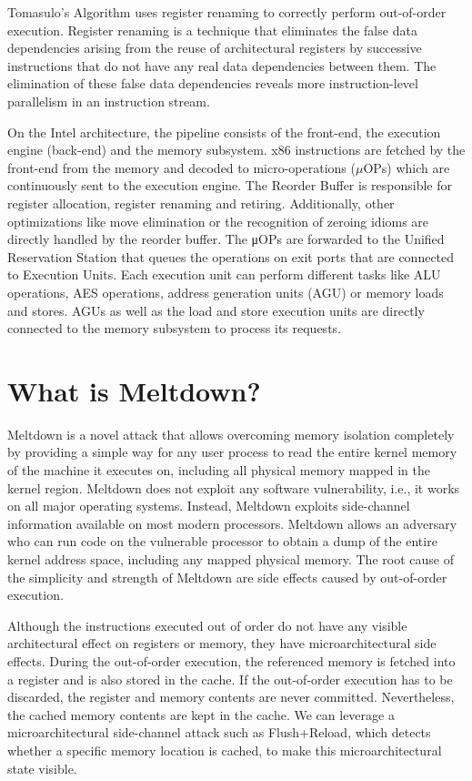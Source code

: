 \documentclass[runningheads]{llncs}
\begin{document}
Tomasulo's Algorithm uses register renaming to correctly perform out-of-order execution. Register renaming is a technique that eliminates the false data dependencies arising from the reuse of architectural registers by successive instructions that do not have any real data dependencies between them. The elimination of these false data dependencies reveals more instruction-level parallelism in an instruction stream. 

On the Intel architecture, the pipeline consists of the front-end, the execution engine (back-end) and the memory subsystem. x86 instructions are fetched by the front-end from the memory and decoded to micro-operations ($\mu$OPs) which are continuously sent to the execution engine. The Reorder Buffer is responsible for register allocation, register renaming and retiring. Additionally, other optimizations like move elimination or the recognition of zeroing idioms are directly handled by the reorder buffer. The μOPs are forwarded to the Unified Reservation Station that queues the operations on exit ports that are connected to Execution Units. Each execution unit can perform different tasks like ALU operations, AES operations, address generation units (AGU) or memory loads and stores. AGUs as well as the load and store execution units are directly connected to the memory subsystem to process its requests.

\section{What is Meltdown?}
Meltdown is a novel attack that allows overcoming memory isolation completely by providing a simple way for any user process to read the entire kernel memory of the machine it executes on, including all physical memory mapped in the kernel region. Meltdown does not exploit any software vulnerability, i.e., it works on all major operating systems. Instead, Meltdown exploits side-channel information available on most modern processors. Meltdown allows an adversary who can run code on the vulnerable processor to obtain a dump of the entire kernel address space, including any mapped physical memory. The root cause of the simplicity and strength of Meltdown are side effects caused by out-of-order execution.

Although the instructions executed out of order do not have any visible architectural effect on registers or memory, they have microarchitectural side effects. During the out-of-order execution, the referenced memory is fetched into a register and is also stored in the cache. If the out-of-order execution has to be discarded, the register and memory contents are never committed. Nevertheless, the cached memory contents are kept in the cache. We can leverage a microarchitectural side-channel attack such as Flush+Reload, which detects whether a specific memory location is cached, to make this microarchitectural state visible.
	
\end{document}
